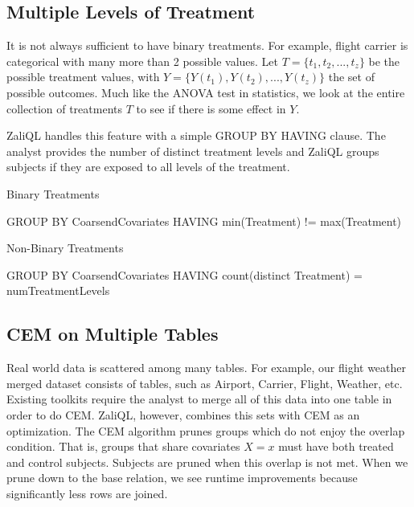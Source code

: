 \subsection{Multiple Levels of Treatment}
\label{sec:baserel}

It is not always sufficient to have binary treatments.
For example, flight carrier is categorical with many more than 2 possible values.
Let $T = \{t_1, t_2,...,t_z\}$ be the possible treatment values, with
$Y = \{Y(t_1), Y(t_2),...,Y(t_z)\}$ the set of possible outcomes.
Much like the ANOVA test in statistics, we look at the entire collection of treatments $T$
to see if there is some effect in $Y$.


ZaliQL handles this feature with a simple GROUP BY HAVING clause.
The analyst provides the number of distinct treatment levels and ZaliQL
groups subjects if they are exposed to all levels of the treatment.

\begin{algorithm} \small
\caption{Binary Treatments} \label{alg:havingtreatments}
GROUP BY CoarsendCovariates \newline
HAVING min(Treatment) != max(Treatment)
\end{algorithm}
\begin{algorithm} \small
\caption{Non-Binary Treatments} \label{alg:havingtreatments}
GROUP BY CoarsendCovariates \newline
HAVING count(distinct Treatment) = numTreatmentLevels
\end{algorithm}


\subsection{CEM on Multiple Tables}
\label{sec:baserel}

Real world data is scattered among many tables. For example, our flight weather merged
dataset consists of tables, such as Airport, Carrier, Flight, Weather, etc.
Existing toolkits require the analyst to merge all of this data into one table in order to do CEM.
ZaliQL, however, combines this sets with CEM as an optimization.
The CEM algorithm prunes groups which do not enjoy the overlap condition.
That is, groups that share covariates $X=x$ must have both treated and control subjects.
Subjects are pruned when this overlap is not met.
When we prune down to the base relation, we see runtime improvements because significantly
less rows are joined.

